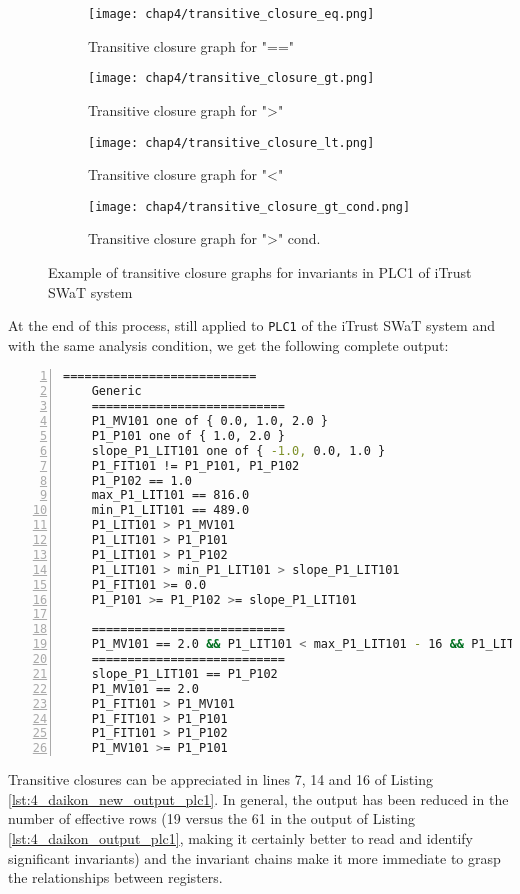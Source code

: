 \begin{figure}[H]
	\centering
	\begin{subfigure}{0.48\textwidth}
		\texttt{[image: chap4/transitive\_closure\_eq.png]}
		\caption{Transitive closure graph for "=="}
		\label{subfig:4_graph_eq}
	\end{subfigure}
	\hfill
	\begin{subfigure}{0.48\textwidth}
		\texttt{[image: chap4/transitive\_closure\_gt.png]}
		\caption{Transitive closure graph for ">"}
		\label{subfig:4_graph_gt}
	\end{subfigure}
	\begin{subfigure}{0.48\textwidth}
		\texttt{[image: chap4/transitive\_closure\_lt.png]}
		\caption{Transitive closure graph for "<"}
		\label{subfig:4_graph_lt}
	\end{subfigure}
	\hfill
	\begin{subfigure}{0.48\textwidth}
		\texttt{[image: chap4/transitive\_closure\_gt\_cond.png]}
		\caption{Transitive closure graph for ">" cond.}
		\label{subfig:4_graph_gt_cond}
	\end{subfigure}
	\caption{Example of transitive closure graphs for invariants in PLC1 of iTrust SWaT system}
	\label{fig:4_transitive_closure_graphs}
\end{figure}
At the end of this process, still applied to \texttt{PLC1} of the iTrust SWaT system and with the same analysis condition, we get the following complete output:

\begin{lstlisting}[language=bash,numbers=left,caption={Revised Daikon output with transitive closures for \texttt{PLC1} of the iTrust SWaT system},label=lst:4_daikon_new_output_plc1]
	===========================
	Generic
	===========================
	P1_MV101 one of { 0.0, 1.0, 2.0 }
	P1_P101 one of { 1.0, 2.0 }
	slope_P1_LIT101 one of { -1.0, 0.0, 1.0 }
	P1_FIT101 != P1_P101, P1_P102
	P1_P102 == 1.0
	max_P1_LIT101 == 816.0
	min_P1_LIT101 == 489.0
	P1_LIT101 > P1_MV101
	P1_LIT101 > P1_P101
	P1_LIT101 > P1_P102
	P1_LIT101 > min_P1_LIT101 > slope_P1_LIT101
	P1_FIT101 >= 0.0
	P1_P101 >= P1_P102 >= slope_P1_LIT101
	
	===========================
	P1_MV101 == 2.0 && P1_LIT101 < max_P1_LIT101 - 16 && P1_LIT101 > min_P1_LIT101 + 15
	===========================
	slope_P1_LIT101 == P1_P102
	P1_MV101 == 2.0
	P1_FIT101 > P1_MV101
	P1_FIT101 > P1_P101
	P1_FIT101 > P1_P102
	P1_MV101 >= P1_P101
\end{lstlisting}
Transitive closures can be appreciated in lines 7, 14 and 16 of Listing \ref{lst:4_daikon_new_output_plc1}.\newline
In general, the output has been reduced in the number of effective rows (19 versus the 61 in the output of Listing \ref{lst:4_daikon_output_plc1}, making it certainly better to read and identify significant invariants) and the invariant chains make it more immediate to grasp the relationships between registers.


